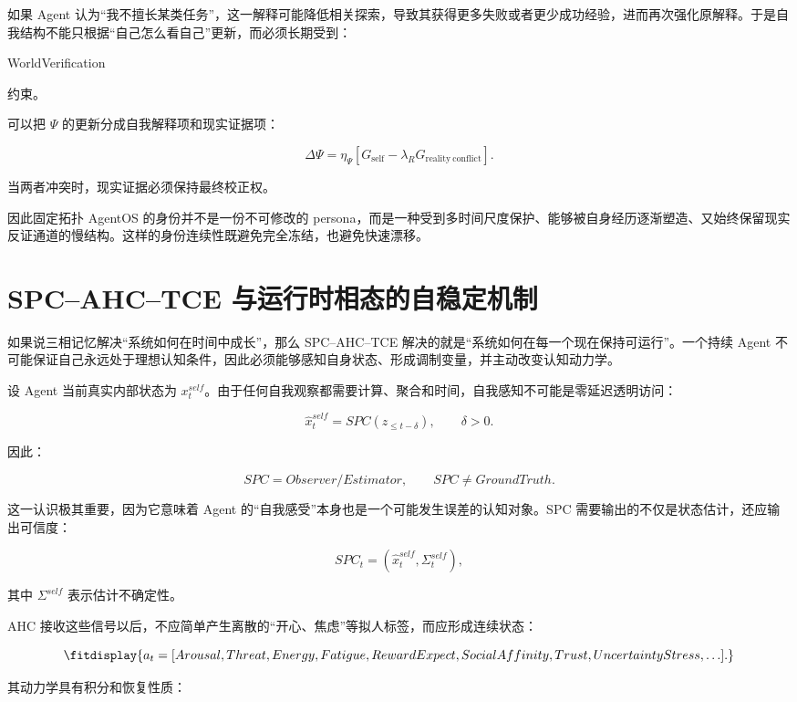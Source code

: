 如果 Agent 认为“我不擅长某类任务”，这一解释可能降低相关探索，导致其获得更多失败或者更少成功经验，进而再次强化原解释。于是自我结构不能只根据“自己怎么看自己”更新，而必须长期受到：

\begin{statementbox}
WorldVerification
\end{statementbox}

约束。

可以把 $\Psi$ 的更新分成自我解释项和现实证据项：

\[
\Delta\Psi
=
\eta_\Psi
\left[
G_{\mathrm{self}}
-
\lambda_R
G_{\mathrm{reality\ conflict}}
\right].
\]

当两者冲突时，现实证据必须保持最终校正权。

因此固定拓扑 AgentOS 的身份并不是一份不可修改的 persona，而是一种受到多时间尺度保护、能够被自身经历逐渐塑造、又始终保留现实反证通道的慢结构。这样的身份连续性既避免完全冻结，也避免快速漂移。

\section{SPC--AHC--TCE 与运行时相态的自稳定机制}

如果说三相记忆解决“系统如何在时间中成长”，那么 SPC--AHC--TCE 解决的就是“系统如何在每一个现在保持可运行”。一个持续 Agent 不可能保证自己永远处于理想认知条件，因此必须能够感知自身状态、形成调制变量，并主动改变认知动力学。

设 Agent 当前真实内部状态为 $x_t^{self}$。由于任何自我观察都需要计算、聚合和时间，自我感知不可能是零延迟透明访问：

\[
\hat{x}^{self}_t
=
SPC
\left(
z_{\leq t-\delta}
\right),
\qquad
\delta>0.
\]

因此：

\[
\boxed{
SPC
=
Observer/Estimator,
\qquad
SPC\neq GroundTruth.
}
\]

这一认识极其重要，因为它意味着 Agent 的“自我感受”本身也是一个可能发生误差的认知对象。SPC 需要输出的不仅是状态估计，还应输出可信度：

\[
SPC_t
=
(\hat{x}^{self}_t,\Sigma^{self}_t),
\]

其中 $\Sigma^{self}$ 表示估计不确定性。

AHC 接收这些信号以后，不应简单产生离散的“开心、焦虑”等拟人标签，而应形成连续状态：

\[
\fitdisplay{
a_t
=
[
Arousal,
Threat,
Energy,
Fatigue,
RewardExpect,
SocialAffinity,
Trust,
UncertaintyStress,\ldots].
}
\]

其动力学具有积分和恢复性质：

